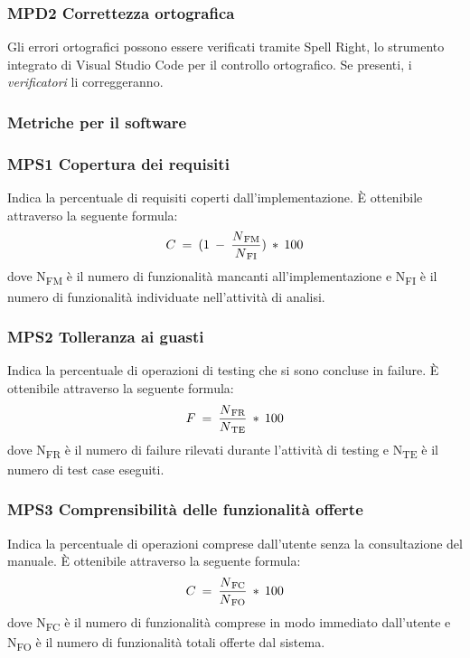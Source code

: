     \subsubsection{MPD2 Correttezza ortografica}
    Gli errori ortografici possono essere verificati tramite Spell Right, lo strumento integrato di Visual Studio Code per il controllo ortografico.
    Se presenti, i \textit{verificatori} li correggeranno.
    
    \subsubsection{Metriche per il software}
      \subsubsection{MPS1 Copertura dei requisiti}
      Indica la percentuale di requisiti coperti dall'implementazione. È ottenibile attraverso la seguente formula:
        \begin{displaymath}{C \: = \: (1 \: - \: {N\textsubscript{FM} \over N\textsubscript{FI}}) \: * \: 100}\end{displaymath}
          dove N\textsubscript{FM} è il numero di funzionalità mancanti all'implementazione e N\textsubscript{FI} è il numero di funzionalità individuate nell'attività di analisi.
 
      \subsubsection{MPS2 Tolleranza ai guasti}
      Indica la percentuale di operazioni di testing che si sono concluse in failure. È ottenibile attraverso la seguente formula:
        \begin{displaymath}{F \: = \: {N\textsubscript{FR} \over N\textsubscript{TE}} \: * \: 100}\end{displaymath}
          dove N\textsubscript{FR} è il numero di failure rilevati durante l'attività di testing e N\textsubscript{TE} è il numero di test case eseguiti.
      
      \subsubsection{MPS3 Comprensibilità delle funzionalità offerte}
      Indica la percentuale di operazioni comprese dall'utente senza la consultazione del manuale. È ottenibile attraverso la seguente formula:
        \begin{displaymath}{C \: = \: {N\textsubscript{FC} \over N\textsubscript{FO}} \: * \: 100}\end{displaymath}
          dove N\textsubscript{FC} è il numero di funzionalità comprese in modo immediato dall'utente e N\textsubscript{FO} è il numero di funzionalità totali offerte dal sistema.
      
